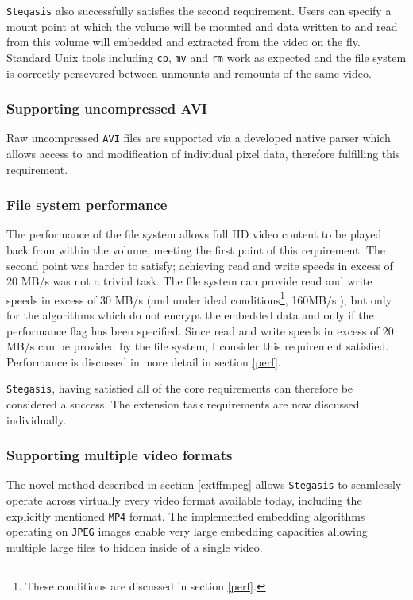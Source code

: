 \documentclass[paper=a4, fontsize=11pt,twoside]{scrartcl}
\numberwithin{table}{section}
\numberwithin{figure}{section}
\numberwithin{algorithm}{section}
\begin{document}
\texttt{Stegasis} also successfully satisfies the second requirement. Users can specify a mount point at which the volume will be mounted and data written to and read from this volume will embedded and extracted from the video on the fly. Standard Unix tools including \texttt{cp}, \texttt{mv} and \texttt{rm} work as expected and the file system is correctly persevered between unmounts and remounts of the same video.

\subsubsection{Supporting uncompressed AVI}

Raw uncompressed \texttt{AVI} files are supported via a developed native parser which allows access to and modification of individual pixel data, therefore fulfilling this requirement.

\subsubsection{File system performance}

The performance of the file system allows full HD video content to be played back from within the volume, meeting the first point of this requirement. The second point was harder to satisfy; achieving read and write speeds in excess of 20 MB/s was not a trivial task. The file system can provide read and write speeds in excess of 30 MB/s (and under ideal conditions\footnote{These conditions are discussed in section \ref{perf}.},  160MB/s.), but only for the algorithms which do not encrypt the embedded data and only if the performance flag has been specified. Since read and write speeds in excess of 20 MB/s can be provided by the file system, I consider this requirement satisfied. Performance is discussed in more detail in section \ref{perf}.

\noindent
\texttt{Stegasis}, having satisfied all of the core requirements can therefore be considered a success. The extension task requirements are now discussed individually. 

\subsubsection{Supporting multiple video formats}

The novel method described in section \ref{extffmpeg} allows \texttt{Stegasis} to seamlessly operate across virtually every video format available today, including the explicitly mentioned \texttt{MP4} format. The implemented embedding algorithms operating on \texttt{JPEG} images enable very large embedding capacities allowing multiple large files to hidden inside of a single video.
\end{document}
